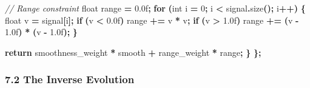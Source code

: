 \documentclass[
  11pt,
  a4paper,
]{article}
\newenvironment{Shaded}{\begin{snugshade}}{\end{snugshade}}
\newcommand{\BuiltInTok}[1]{#1}
\newcommand{\CommentTok}[1]{\textcolor[rgb]{0.56,0.35,0.01}{\textit{#1}}}
\newcommand{\ControlFlowTok}[1]{\textcolor[rgb]{0.13,0.29,0.53}{\textbf{#1}}}
\newcommand{\DataTypeTok}[1]{\textcolor[rgb]{0.13,0.29,0.53}{#1}}
\newcommand{\DecValTok}[1]{\textcolor[rgb]{0.00,0.00,0.81}{#1}}
\newcommand{\FloatTok}[1]{\textcolor[rgb]{0.00,0.00,0.81}{#1}}
\newcommand{\NormalTok}[1]{#1}
\newcommand{\OperatorTok}[1]{\textcolor[rgb]{0.81,0.36,0.00}{\textbf{#1}}}
\begin{document}
\begin{Shaded}
\begin{Highlighting}[]
        \CommentTok{// Range constraint}
        \DataTypeTok{float}\NormalTok{ range }\OperatorTok{=} \FloatTok{0.0}\BuiltInTok{f}\OperatorTok{;}
        \ControlFlowTok{for} \OperatorTok{(}\DataTypeTok{int}\NormalTok{ i }\OperatorTok{=} \DecValTok{0}\OperatorTok{;}\NormalTok{ i }\OperatorTok{\textless{}}\NormalTok{ signal}\OperatorTok{.}\NormalTok{size}\OperatorTok{();}\NormalTok{ i}\OperatorTok{++)} \OperatorTok{\{}
            \DataTypeTok{float}\NormalTok{ v }\OperatorTok{=}\NormalTok{ signal}\OperatorTok{[}\NormalTok{i}\OperatorTok{];}
            \ControlFlowTok{if} \OperatorTok{(}\NormalTok{v }\OperatorTok{\textless{}} \FloatTok{0.0}\BuiltInTok{f}\OperatorTok{)}\NormalTok{ range }\OperatorTok{+=}\NormalTok{ v }\OperatorTok{*}\NormalTok{ v}\OperatorTok{;}
            \ControlFlowTok{if} \OperatorTok{(}\NormalTok{v }\OperatorTok{\textgreater{}} \FloatTok{1.0}\BuiltInTok{f}\OperatorTok{)}\NormalTok{ range }\OperatorTok{+=} \OperatorTok{(}\NormalTok{v }\OperatorTok{{-}} \FloatTok{1.0}\BuiltInTok{f}\OperatorTok{)} \OperatorTok{*} \OperatorTok{(}\NormalTok{v }\OperatorTok{{-}} \FloatTok{1.0}\BuiltInTok{f}\OperatorTok{);}
        \OperatorTok{\}}
        
        \ControlFlowTok{return}\NormalTok{ smoothness\_weight }\OperatorTok{*}\NormalTok{ smooth }\OperatorTok{+}\NormalTok{ range\_weight }\OperatorTok{*}\NormalTok{ range}\OperatorTok{;}
    \OperatorTok{\}}
\OperatorTok{\};}
\end{Highlighting}
\end{Shaded}

\subsubsection{7.2 The Inverse Evolution}\label{the-inverse-evolution}
\end{document}
